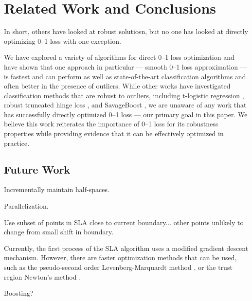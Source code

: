 \section{Related Work and Conclusions}
\label{cha:conclusions}

\COMMENT
In short, others have looked at robust solutiosn, but no one
has looked at directly optimizing 0--1 loss with one
exception.
\ENDCOMMENT

We have explored a variety of algorithms for direct 0--1 loss
optimization and have shown that one approach in particular --- smooth
0--1 loss approximation --- is fastest and can perform as well as
state-of-the-art classification algorithms and often better in the
presence of outliers.  While other works have investigated
classification methods that are robust to outliers, including
t-logistic regression \cite{Ding}, robust truncated hinge loss
\cite{wu07}, and SavageBoost \cite{lossdesign}, we are unaware of any
work that has successfully directly optimized 0--1 loss --- our
primary goal in this paper.  We believe this work reiterates the
importance of 0--1 loss for its robustness properties while providing
evidence that it can be effectively optimized in practice.

\COMMENT

\subsection{Future Work}
\label{sec:concl.futurework}

Incrementally maintain half-spaces.

Parallelization.

Use subset of points in SLA close to current boundary... other
points unlikely to change from small shift in boundary.

Currently, the first process of the SLA algorithm uses a modified
gradient descent mechanism. However, there are faster optimization
methods that can be used, such as the pseudo-second order
Levenberg-Marquardt method \cite{Marquardt}, or the trust region
Newton's method \cite{Steihaug}.

Boosting?

\ENDCOMMENT
